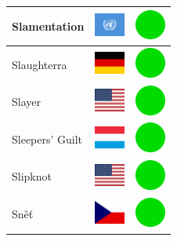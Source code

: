 \documentclass[12pt, a4paper, twoside]{report}
\begin{document}
\begin{center}
\begin{longtable}{|p{5cm}|p{2cm}|p{2cm}|}
 Slamentation                                               & \includegraphics[width=1cm]{4x3/un} &   \includegraphics[width=1cm]{likes/y} \\ \hline
 Slaughterra                                                & \includegraphics[width=1cm]{4x3/de} &   \includegraphics[width=1cm]{likes/y} \\ \hline
 Slayer                                                     & \includegraphics[width=1cm]{4x3/us} &   \includegraphics[width=1cm]{likes/y} \\ \hline
 Sleepers' Guilt                                            & \includegraphics[width=1cm]{4x3/lu} &   \includegraphics[width=1cm]{likes/y} \\ \hline
 Slipknot                                                   & \includegraphics[width=1cm]{4x3/us} &   \includegraphics[width=1cm]{likes/y} \\ \hline
 Sněť                                                       & \includegraphics[width=1cm]{4x3/cz} &   \includegraphics[width=1cm]{likes/y} \\ \hline

\end{longtable}
\end{center}
\end{document}
